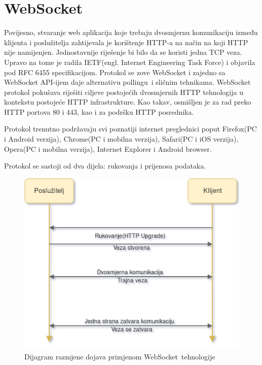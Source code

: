 \documentclass[times, utf8, zavrsni]{fer}
\begin{document}
\section{WebSocket}
Povijesno, stvaranje web aplikacija koje trebaju dvosmjernu komunikaciju između klijenta i poslužitelja zahtijevala je korištenje HTTP-a na način na koji HTTP nije namijenjen. Jednostavnije riješenje bi bilo da se koristi jedna TCP veza. Upravo na tome je radila IETF(engl. Internet Engineering Task Force) i objavila pod RFC 6455 specifikacijom. Protokol se zove WebSocket i zajedno sa WebSocket API-ijem daje alternativu \glqq pollingu\grqq\  i sličnim tehnikama. WebSocket protokol pokušava riješiti ciljeve postojećih dvosmjernih HTTP tehnologija u kontekstu postojeće HTTP infrastrukture. Kao takav, osmišljen je za rad preko HTTP portova 80 i 443, kao i za podršku HTTP posrednika.

Protokol trenutno podržavaju svi poznatiji internet preglednici poput Firefox(PC i Android verzija), Chrome(PC i mobilna verzija), Safari(PC i iOS verzija), Opera(PC i mobilna verzija), Internet Explorer i Android browser.

Protokol se sastoji od dva dijela: rukovanja i prijenosa podataka.\citep{rfc6455}

\begin{figure}[htb]
\centering
\includegraphics[width=14cm]{img/websocket.png}
\caption{Dijagram razmjene dojava primjenom \glqq WebSocket\grqq\  tehnologije}
\label{fig:websocket-image}
\end{figure}
\end{document}
